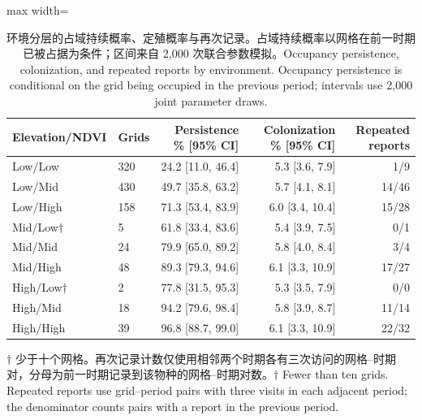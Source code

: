 \begin{table}[htbp]\centering\footnotesize
\caption{\ifzh 环境分层的占域持续概率、定殖概率与再次记录。占域持续概率以网格在前一时期已被占据为条件；区间来自 2,000 次联合参数模拟。\else Occupancy persistence, colonization, and repeated reports by environment. Occupancy persistence is conditional on the grid being occupied in the previous period; intervals use 2,000 joint parameter draws.\fi}\label{tab:envpersistence}
\begin{adjustbox}{max width=\linewidth}\begin{tabular}{llrrr}\toprule
Elevation/NDVI & Grids & Persistence \% [95\% CI] & Colonization \% [95\% CI] & Repeated reports \\ \midrule
Low/Low & 320 & 24.2 [11.0, 46.4] & 5.3 [3.6, 7.9] & 1/9 \\
Low/Mid & 430 & 49.7 [35.8, 63.2] & 5.7 [4.1, 8.1] & 14/46 \\
Low/High & 158 & 71.3 [53.4, 83.9] & 6.0 [3.4, 10.4] & 15/28 \\
Mid/Low$\dagger$ & 5 & 61.8 [33.4, 83.6] & 5.4 [3.9, 7.5] & 0/1 \\
Mid/Mid & 24 & 79.9 [65.0, 89.2] & 5.8 [4.0, 8.4] & 3/4 \\
Mid/High & 48 & 89.3 [79.3, 94.6] & 6.1 [3.3, 10.9] & 17/27 \\
High/Low$\dagger$ & 2 & 77.8 [31.5, 95.3] & 5.3 [3.5, 7.9] & 0/0 \\
High/Mid & 18 & 94.2 [79.6, 98.4] & 5.8 [3.9, 8.7] & 11/14 \\
High/High & 39 & 96.8 [88.7, 99.0] & 6.1 [3.3, 10.9] & 22/32 \\
\bottomrule\end{tabular}\end{adjustbox}
\par\smallskip\ifzh $\dagger$ 少于十个网格。再次记录计数仅使用相邻两个时期各有三次访问的网格--时期对，分母为前一时期记录到该物种的网格--时期对数。\else $\dagger$ Fewer than ten grids. Repeated reports use grid--period pairs with three visits in each adjacent period; the denominator counts pairs with a report in the previous period.\fi
\end{table}
